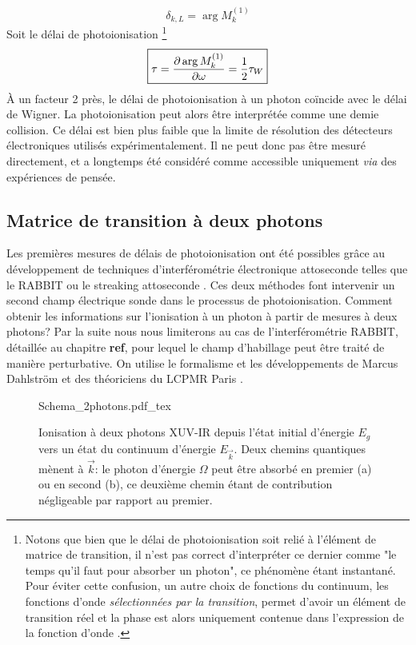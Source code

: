 \begin{equation}
\delta_{k,L} = \arg M^{(1)}_{k} 
\end{equation}
Soit le délai de photoionisation \footnote{Notons que bien que le délai de photoionisation soit relié à l'élément de matrice de transition, il n'est pas correct d'interpréter ce dernier comme "le temps qu'il faut pour absorber un photon", ce phénomène étant instantané. Pour éviter cette confusion, un autre choix de fonctions du continuum, les fonctions d'onde \textit{sélectionnées par la transition}, permet d'avoir un élément de transition réel et la phase est alors uniquement contenue dans l'expression de la fonction d'onde .}
\begin{equation}
\setlength\fboxrule{0.5pt}
\boxed{
\tau = \frac{\partial \arg M^{(1)}_{k}}{\partial \omega} = \frac{1}{2} \tau_W
}
\end{equation}
\`A un facteur 2 près, le délai de photoionisation à un photon coïncide avec le délai de Wigner. La photoionisation peut alors être interprétée comme une demie collision. Ce délai est bien plus faible que la limite de résolution des détecteurs électroniques utilisés expérimentalement. Il ne peut donc pas être mesuré directement, et a longtemps été considéré comme accessible uniquement \textit{via} des expériences de pensée.

\subsection{Matrice de transition à deux photons}
Les premières mesures de délais de photoionisation ont été possibles grâce au développement de techniques d'interférométrie électronique attoseconde telles que le RABBIT  ou le streaking attoseconde . Ces deux méthodes font intervenir un second champ électrique sonde dans le processus de photoionisation. Comment obtenir les informations sur l'ionisation à un photon à partir de mesures à deux photons? Par la suite nous nous limiterons au cas de l'interférométrie RABBIT, détaillée au chapitre \textbf{ref}, pour lequel le champ d'habillage peut être traité de manière perturbative. On utilise le formalisme et les développements de Marcus Dahlström et des théoriciens du LCPMR Paris .

\begin{figure}
\centering
\def\svgwidth{0.7\columnwidth}
{Schema_2photons.pdf_tex}
\caption{Ionisation à deux photons XUV-IR depuis l'état initial d'énergie $E_g$ vers un état du continuum d'énergie $E_{\vec{k}}$. Deux chemins quantiques mènent à $\vec{k}$: le photon d'énergie $\Omega$ peut être absorbé en premier (a) ou en second (b), ce deuxième chemin étant de contribution négligeable par rapport au premier.}
\label{fig:Schema_2photons}
\end{figure}

